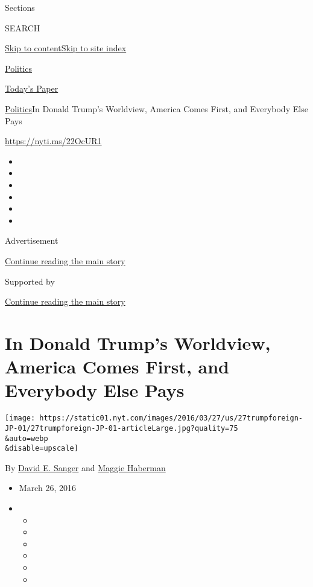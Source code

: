 Sections

SEARCH

\protect\hyperlink{site-content}{Skip to
content}\protect\hyperlink{site-index}{Skip to site index}

\href{https://www.nytimes.com/section/politics}{Politics}

\href{https://myaccount.nytimes.com/auth/login?response_type=cookie\&client_id=vi}{}

\href{https://www.nytimes.com/section/todayspaper}{Today's Paper}

\href{/section/politics}{Politics}\textbar{}In Donald Trump's Worldview,
America Comes First, and Everybody Else Pays

\url{https://nyti.ms/22OcUR1}

\begin{itemize}
\item
\item
\item
\item
\item
\item
\end{itemize}

Advertisement

\protect\hyperlink{after-top}{Continue reading the main story}

Supported by

\protect\hyperlink{after-sponsor}{Continue reading the main story}

\hypertarget{in-donald-trumps-worldview-america-comes-first-and-everybody-else-pays}{%
\section{In Donald Trump's Worldview, America Comes First, and Everybody
Else
Pays}\label{in-donald-trumps-worldview-america-comes-first-and-everybody-else-pays}}

\texttt{[image: https://static01.nyt.com/images/2016/03/27/us/27trumpforeign-JP-01/27trumpforeign-JP-01-articleLarge.jpg?quality=75\\\&auto=webp\\\&disable=upscale]}

By \href{http://www.nytimes.com/by/david-e-sanger}{David E. Sanger} and
\href{http://www.nytimes.com/by/maggie-haberman}{Maggie Haberman}

\begin{itemize}
\item
  March 26, 2016
\item
  \begin{itemize}
  \item
  \item
  \item
  \item
  \item
  \item
  \end{itemize}
\end{itemize}

